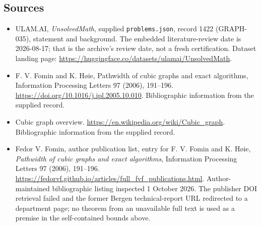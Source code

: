 \documentclass[11pt,a4paper]{article}
\begin{document}
\subsection{Sources}

{\small

\begin{itemize}

\item[\hypertarget{source:1422:1}{S1}] ULAM.AI, \emph{UnsolvedMath}, supplied \texttt{problems.json}, record 1422 (GRAPH-035), statement and background. The embedded literature-review date is 2026-08-17; that is the archive’s review date, not a fresh certification. Dataset landing page: \url{https://huggingface.co/datasets/ulamai/UnsolvedMath}.

\item[\hypertarget{source:1422:2}{S2}] F. V. Fomin and K. Høie, Pathwidth of cubic graphs and exact algorithms, Information Processing Letters 97 (2006), 191--196. \url{https://doi.org/10.1016/j.ipl.2005.10.010}. Bibliographic information from the supplied record.

\item[\hypertarget{source:1422:3}{S3}] Cubic graph overview. \url{https://en.wikipedia.org/wiki/Cubic_graph}. Bibliographic information from the supplied record.


\item[E1] Fedor V. Fomin, author publication list,
entry for F. V. Fomin and K. H\o ie, \emph{Pathwidth of cubic graphs
and exact algorithms}, Information Processing Letters 97 (2006),
191--196. \url{https://fedorvf.github.io/articles/full_fvf_publications.html}.
Author-maintained bibliographic listing inspected 1 October 2026.
The publisher DOI retrieval failed and the former Bergen technical-report
URL redirected to a department page; no theorem from an unavailable
full text is used as a premise in the self-contained bounds above.

\end{itemize}

}

\label{end:1422}
\end{document}
